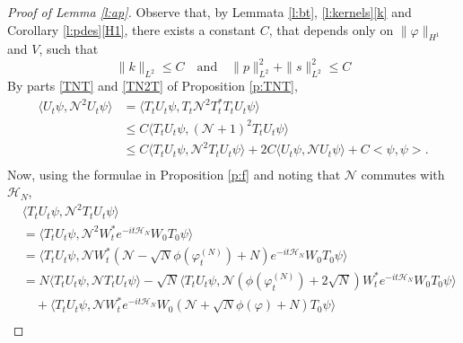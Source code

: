 \documentclass[11pt,a4paper,draft,DIV11]{scrartcl}	%
\newcommand{\N}{\mathcal{N}}
\newcommand{\scal}[2]{\big<#1,#2\big>} %
\newcommand{\ph}{\varphi_t^{(N)}}	%
\begin{document}
\begin{proof}[Proof of Lemma \ref{l:ap}]
  Observe that, by Lemmata \ref{l:bt}, \ref{l:kernels}\ref{k} and Corollary
  \ref{l:pdes}\eqref{H1}, there exists a constant $C$, %
  that depends only on $\| \varphi \|_{H^1}$ and $V$, such that
  \begin{equation} \label{c2}
      \| k \|_{L^2} \le C %
\quad\text{and}\quad
      \| p \|_{L^2}^2 + \| s \|_{L^2}^2 \le C%
  \end{equation}
  By parts \eqref{TNT} and \eqref{TN2T} of Proposition \ref{p:TNT},
  \begin{equation}
    \label{ep4}
    \begin{split}
      \langle U_t \psi, \N^2 U_t \psi \rangle & = \langle T_t U_t \psi, T_t
      \N^2 T_t^* T_t U_t \psi \rangle \\
      & \le C \langle T_t U_t \psi, (\N+1)^2 T_t U_t \psi \rangle \\
      & \le C \langle T_t U_t \psi, \N^2 T_t U_t \psi \rangle + 2 C \langle
      U_t \psi, \N U_t \psi \rangle + C\scal{\psi}{\psi}. \\
    \end{split}
  \end{equation} 
  Now, using the formulae in Proposition \ref{p:f} and noting that $\N$
  commutes with $\mathcal{H}_N$,
  \begin{align*}
    & \langle T_t U_t \psi, \N^2 T_t U_t \psi \rangle \\
    & = \langle T_t U_t \psi, \N^2 W_t^* e^{-it \mathcal{H}_N} W_0 T_0 \psi \rangle
    \\
    & = \langle T_t U_t \psi, \N W_t^* \left(\N - \sqrt{N} \phi(\ph) + N\right)
    e^{-it \mathcal{H}_N} W_0 T_0 \psi \rangle \\
    & = N \langle T_t U_t \psi, \N T_t U_t \psi \rangle - \sqrt{N} \langle T_t
    U_t \psi, \N \left( \phi(\ph) + 2\sqrt{N}\right) W_t^* e^{-it\mathcal{H}_N} W_0 T_0 
    \psi \rangle \\
    & \quad + \langle T_t U_t \psi, \N W_t^* e^{-it\mathcal{H}_N} W_0 \left(\N +
    \sqrt{N} \phi(\varphi) + N\right) T_0 \psi \rangle \\

\end{align*}
\end{proof}
\end{document}
